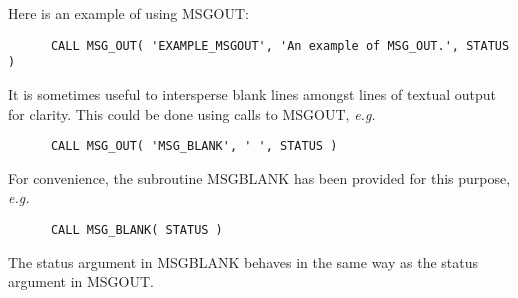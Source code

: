 \documentclass[twoside,11pt]{article}
\renewcommand{\_}{\texttt{\symbol{95}}}
\begin{document}
Here is an example of using MSG\_OUT:
\begin {small}
\begin{verbatim}
      CALL MSG_OUT( 'EXAMPLE_MSGOUT', 'An example of MSG_OUT.', STATUS )
\end{verbatim}
\end {small}
It is sometimes useful to intersperse blank lines amongst lines of textual
output for clarity.
This could be done using calls to MSG\_OUT, \textit{e.g.}
\begin {small}
\begin{verbatim}
      CALL MSG_OUT( 'MSG_BLANK', ' ', STATUS )
\end{verbatim}
\end {small}
For convenience, the subroutine MSG\_BLANK has been provided for this 
purpose, \textit{e.g.}
\begin {small}
\begin{verbatim}
      CALL MSG_BLANK( STATUS )
\end{verbatim}
\end {small}
The status argument in MSG\_BLANK behaves in the same way as the status 
argument in MSG\_OUT.
\end{document}
